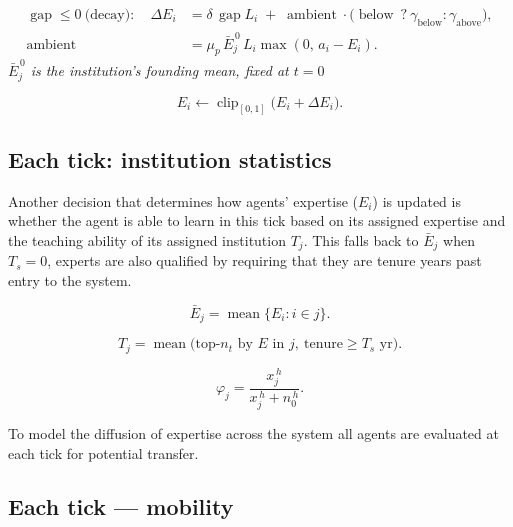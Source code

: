 \documentclass[11pt]{article}
\newcommand{\eqnote}[1]{{\small\itshape #1}\par\addvspace{4pt}}
\begin{document}
\begin{equation}\label{eq:E11}
  \begin{aligned}
    \operatorname{gap} \le 0 \ \text{(decay)}: \quad
    \Delta E_i &= \delta \, \operatorname{gap} L_i \;+\; \operatorname{ambient} \cdot
      \bigl( \operatorname{below} \ ? \ \gamma_{\text{below}} : \gamma_{\text{above}} \bigr), \\
    \operatorname{ambient} &= \mu_p \, \bar E_j^{\,0} \, L_i \max(0,\, a_i - E_i).
  \end{aligned}
\end{equation}
\eqnote{ $\bar E_j^{\,0}$ is the institution's \emph{founding} mean, fixed at
$t = 0$}

\begin{equation}\label{eq:E12}
  E_i \leftarrow \operatorname{clip}_{[0,1]}\!\bigl(E_i + \Delta E_i\bigr).
\end{equation}

\noindent


\subsection*{Each tick: institution statistics}

Another decision that determines how agents' expertise ($E_i$) is updated is whether the agent is able to learn in this tick based on its assigned expertise and the teaching ability of its assigned institution $T_j$. This falls back to $\bar E_j$ when $T_s = 0$, experts are also qualified by requiring that they are tenure years past entry to the system.

\begin{equation}\label{eq:E6}
  \bar E_j = \operatorname{mean}\{E_i : i \in j\}.
\end{equation}

\begin{equation}\label{eq:E7}
  T_j = \operatorname{mean}\bigl(\text{top-}n_t \text{ by } E \text{ in } j,\
        \text{tenure} \ge T_s \text{ yr}\bigr).
\end{equation}


\begin{equation}\label{eq:E8}
  \varphi_j = \frac{x_j^{\,h}}{x_j^{\,h} + n_0^{\,h}}.
\end{equation}
\noindent

To model the diffusion of expertise across the system all agents are evaluated at each tick for potential transfer. 

\subsection*{Each tick --- mobility}
\end{document}
